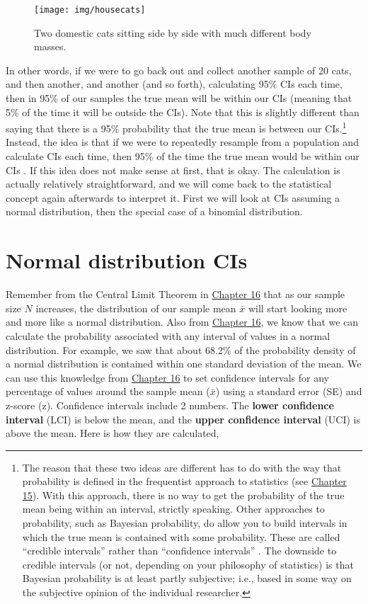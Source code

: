 \documentclass[
]{scrbook}
\begin{document}
\begin{figure}
\texttt{[image: img/housecats]} \caption{Two domestic cats sitting side by side with much different body masses.}\label{fig:unnamed-chunk-83}
\end{figure}

In other words, if we were to go back out and collect another sample of 20 cats, and then another, and another (and so forth), calculating 95\% CIs each time, then in 95\% of our samples the true mean will be within our CIs (meaning that 5\% of the time it will be outside the CIs).
Note that this is slightly different than saying that there is a 95\% probability that the true mean is between our CIs.\footnote{The reason that these two ideas are different has to do with the way that probability is defined in the frequentist approach to statistics (see \protect\hyperlink{Chapter_15}{Chapter 15}). With this approach, there is no way to get the probability of the true mean being within an interval, strictly speaking. Other approaches to probability, such as Bayesian probability, do allow you to build intervals in which the true mean is contained with some probability. These are called ``credible intervals'' rather than ``confidence intervals'' \citep[e.g.,][]{Ellison2004}. The downside to credible intervals (or not, depending on your philosophy of statistics) is that Bayesian probability is at least partly subjective; i.e., based in some way on the subjective opinion of the individual researcher.}
Instead, the idea is that if we were to repeatedly resample from a population and calculate CIs each time, then 95\% of the time the true mean would be within our CIs \citep{Sokal1995}.
If this idea does not make sense at first, that is okay.
The calculation is actually relatively straightforward, and we will come back to the statistical concept again afterwards to interpret it.
First we will look at CIs assuming a normal distribution, then the special case of a binomial distribution.

\hypertarget{normal-distribution-cis}{%
\section{Normal distribution CIs}\label{normal-distribution-cis}}

Remember from the Central Limit Theorem in \protect\hyperlink{Chapter_16}{Chapter 16} that as our sample size \(N\) increases, the distribution of our sample mean \(\bar{x}\) will start looking more and more like a normal distribution.
Also from \protect\hyperlink{Chapter_16}{Chapter 16}, we know that we can calculate the probability associated with any interval of values in a normal distribution.
For example, we saw that about 68.2\% of the probability density of a normal distribution is contained within one standard deviation of the mean.
We can use this knowledge from \protect\hyperlink{Chapter_16}{Chapter 16} to set confidence intervals for any percentage of values around the sample mean (\(\bar{x}\)) using a standard error (SE) and z-score (z).
Confidence intervals include 2 numbers.
The \textbf{lower confidence interval} (LCI) is below the mean, and the \textbf{upper confidence interval} (UCI) is above the mean.
Here is how they are calculated,
\end{document}

